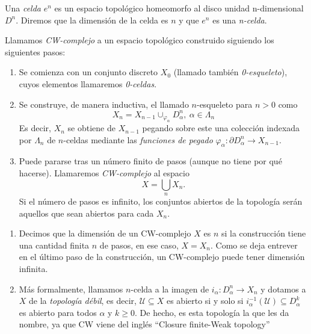 \bigskip

\begin{definition}
    Una \textit{celda} $e^n$ es un espacio topológico homeomorfo al disco unidad n-dimensional $D^n$. Diremos que la dimensión de la celda es $n$ y que $e^n$ es una \textit{n-celda}.
\end{definition}

\bigskip

\begin{definition}
    Llamamos \textit{CW-complejo} a un espacio topológico construido siguiendo los siguientes pasos:

        \begin{enumerate}[label=(\roman*)]
            \item Se comienza con un conjunto discreto $ X_0 $ (llamado también \textit{0-esqueleto}), cuyos elementos llamaremos \textit{0-celdas}.
            
            \item Se construye, de manera inductiva, el llamado $ n $-esqueleto para $n>0$ como
            \begin{equation*}
                X_n = X_{n-1}\cup_{\varphi_{\alpha}}D^n_{\alpha},~\alpha\in \Lambda_n
            \end{equation*}
            Es decir, $X_n$ se obtiene de $X_{n-1}$ pegando sobre este una colección indexada por $\Lambda_n$ de $n$-celdas mediante las \textit{funciones de pegado} $\varphi_{\alpha} : \partial D^n_{\alpha} \to X_{n-1}$.
            
            \item Puede pararse tras un número finito de pasos (aunque no tiene por qué hacerse). Llamaremos \textit{CW-complejo} al espacio 
            \begin{equation*}
                X = \bigcup_{n} X_n.    
            \end{equation*}
            Si el número de pasos es infinito, los conjuntos abiertos de la topología serán aquellos que sean abiertos para cada $ X_n $.
        \end{enumerate} 
\end{definition}

\bigskip

\begin{remark} \hfill
    \begin{enumerate}
        \item Decimos que la dimensión de un CW-complejo $X$ es $n$ si la construcción tiene una cantidad finita $n$ de pasos, en ese caso, $X=X_n$. Como se deja entrever en el último paso de la construcción, un CW-complejo puede tener dimensión infinita.
        \item Más formalmente, llamamos $n$-celda a la imagen de $i_{\alpha}: D^n_{\alpha}\to X_n$ y dotamos a $X$ de la \textit{topología débil}, es decir, $\mathcal{U}\subseteq X$ es abierto si y solo si $i^{-1}_{\alpha}(\mathcal{U})\subseteq D^k_{\alpha}$ es abierto para todos $\alpha$ y $k\ge 0$. De hecho, es esta topología la que les da nombre, ya que CW viene del inglés ``Closure finite-Weak topology''
    \end{enumerate}
\end{remark}


